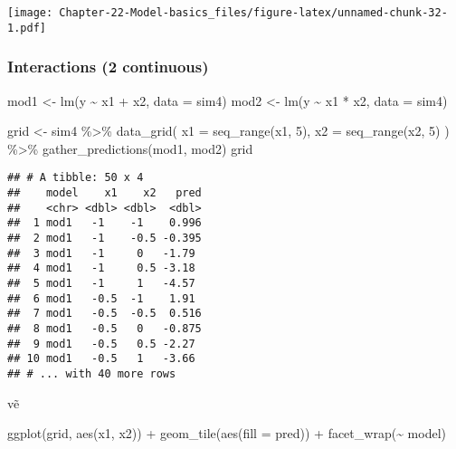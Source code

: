 \documentclass[
]{article}
\newenvironment{Shaded}{\begin{snugshade}}{\end{snugshade}}
\newcommand{\AttributeTok}[1]{\textcolor[rgb]{0.77,0.63,0.00}{#1}}
\newcommand{\DecValTok}[1]{\textcolor[rgb]{0.00,0.00,0.81}{#1}}
\newcommand{\FunctionTok}[1]{\textcolor[rgb]{0.00,0.00,0.00}{#1}}
\newcommand{\NormalTok}[1]{#1}
\newcommand{\OtherTok}[1]{\textcolor[rgb]{0.56,0.35,0.01}{#1}}
\newcommand{\SpecialCharTok}[1]{\textcolor[rgb]{0.00,0.00,0.00}{#1}}
\begin{document}
\texttt{[image: Chapter-22-Model-basics\_files/figure-latex/unnamed-chunk-32-1.pdf]}

\hypertarget{interactions-2-continuous}{%
\subsubsection{Interactions (2
continuous)}\label{interactions-2-continuous}}

\begin{Shaded}
\begin{Highlighting}[]
\NormalTok{mod1 }\OtherTok{\textless{}{-}} \FunctionTok{lm}\NormalTok{(y }\SpecialCharTok{\textasciitilde{}}\NormalTok{ x1 }\SpecialCharTok{+}\NormalTok{ x2, }\AttributeTok{data =}\NormalTok{ sim4)}
\NormalTok{mod2 }\OtherTok{\textless{}{-}} \FunctionTok{lm}\NormalTok{(y }\SpecialCharTok{\textasciitilde{}}\NormalTok{ x1 }\SpecialCharTok{*}\NormalTok{ x2, }\AttributeTok{data =}\NormalTok{ sim4)}

\NormalTok{grid }\OtherTok{\textless{}{-}}\NormalTok{ sim4 }\SpecialCharTok{\%\textgreater{}\%} 
  \FunctionTok{data\_grid}\NormalTok{(}
    \AttributeTok{x1 =} \FunctionTok{seq\_range}\NormalTok{(x1, }\DecValTok{5}\NormalTok{), }
    \AttributeTok{x2 =} \FunctionTok{seq\_range}\NormalTok{(x2, }\DecValTok{5}\NormalTok{) }
\NormalTok{  ) }\SpecialCharTok{\%\textgreater{}\%} 
  \FunctionTok{gather\_predictions}\NormalTok{(mod1, mod2)}
\NormalTok{grid}
\end{Highlighting}
\end{Shaded}

\begin{verbatim}
## # A tibble: 50 x 4
##    model    x1    x2   pred
##    <chr> <dbl> <dbl>  <dbl>
##  1 mod1   -1    -1    0.996
##  2 mod1   -1    -0.5 -0.395
##  3 mod1   -1     0   -1.79 
##  4 mod1   -1     0.5 -3.18 
##  5 mod1   -1     1   -4.57 
##  6 mod1   -0.5  -1    1.91 
##  7 mod1   -0.5  -0.5  0.516
##  8 mod1   -0.5   0   -0.875
##  9 mod1   -0.5   0.5 -2.27 
## 10 mod1   -0.5   1   -3.66 
## # ... with 40 more rows
\end{verbatim}

vẽ

\begin{Shaded}
\begin{Highlighting}[]
\FunctionTok{ggplot}\NormalTok{(grid, }\FunctionTok{aes}\NormalTok{(x1, x2)) }\SpecialCharTok{+} 
  \FunctionTok{geom\_tile}\NormalTok{(}\FunctionTok{aes}\NormalTok{(}\AttributeTok{fill =}\NormalTok{ pred)) }\SpecialCharTok{+} 
  \FunctionTok{facet\_wrap}\NormalTok{(}\SpecialCharTok{\textasciitilde{}}\NormalTok{ model)}
\end{Highlighting}
\end{Shaded}
\end{document}
